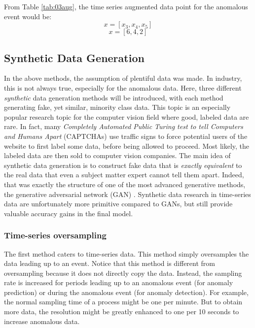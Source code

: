 From Table \ref{tab:03aug}, the time series augmented data point for the anomalous event would be:
$$x = [x_3, x_4, x_5]$$
$$x = [6, 4, 2]$$


\subsection{Synthetic Data Generation}
In the above methods, the assumption of plentiful data was made.  In industry, this is not always true, especially for the anomalous data.  Here, three different \textit{synthetic} data generation methods will be introduced, with each method generating fake, yet similar, minority class data.  This topic is an especially popular research topic for the computer vision field where good, labeled data are rare. In fact, many \textit{Completely Automated Public Turing test to tell Computers and Humans Apart} (CAPTCHAs) use traffic signs to force potential users of the website to first label some data, before being allowed to proceed. Most likely, the labeled data are then sold to computer vision companies. The main idea of synthetic data generation is to construct fake data that is \textit{exactly equivalent} to the real data that even a subject matter expert cannot tell them apart.  Indeed, that was exactly the structure of one of the most advanced generative methods, the generative adversarial network (GAN) \cite{gan}. Synthetic data research in time-series data are unfortunately more primitive compared to GANs, but still provide valuable accuracy gains in the final model. 

\subsubsection{Time-series oversampling}
The first method caters to time-series data. This method simply oversamples the data leading up to an event.  Notice that this method is different from oversampling because it does not directly copy the data.  Instead, the sampling rate is increased for periods leading up to an anomalous event (for anomaly prediction) or during the anomalous event (for anomaly detection).  For example, the normal sampling time of a process might be one per minute. But to obtain more data, the resolution might be greatly enhanced to one per 10 seconds to increase anomalous data.

